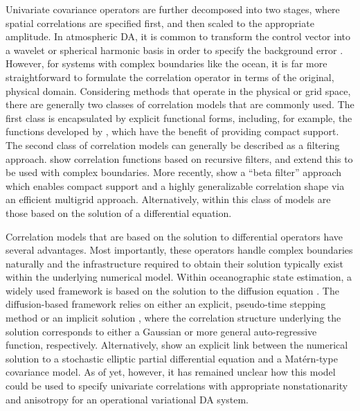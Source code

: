Univariate covariance operators are further decomposed into two stages, where spatial
correlations are specified first, and then scaled to the appropriate amplitude.
In atmospheric DA, it is common to transform the control vector
into a wavelet or spherical harmonic basis in order to specify the background
error \citep[e.g.,][]{bannister_review_2008-2}.
However, for systems with complex boundaries like the ocean, it is far more
straightforward to formulate the correlation operator in terms of the original,
physical domain.
Considering methods that operate in the physical or grid space, there are
generally two classes of correlation models that are commonly used.
The first class is encapsulated by explicit functional forms, including, for
example, the functions developed by
\citet{gaspari_construction_1999,gneiting_correlation_1999,gaspari_construction_2006},
which have the benefit of providing compact support.
The second class of correlation models can generally be described as a filtering
approach.
\citet{purser_numerical_2003-2,purser_numerical_2003-1}
show correlation functions based on recursive filters, and
\citet{dobricic_oceanographic_2008} extend this to be used with complex boundaries.
More recently, \citet{purser_multigrid_2022} show a ``beta
filter'' approach which enables compact support and a highly generalizable
correlation shape via an efficient multigrid approach.
Alternatively, within this class of models are those based on the solution of a
differential equation.

Correlation models that are based on the solution to differential operators have
several advantages.
Most importantly, these operators handle complex boundaries naturally and the
infrastructure required to obtain their solution typically exist within
the underlying numerical model.
Within oceanographic state estimation, a widely used framework is based on the
solution to the diffusion equation
\citep[e.g.,][]{nguyen_arctic_2021,forgetECCOv4,blockley_recent_2014,moore_regional_2011-1,daget_ensemble_2009,muccino_inverse_2008,di_lorenzo_weak_2007,weaver_three-_2003}.
The diffusion-based framework relies on either an explicit, pseudo-time stepping
method \citep{weaver_correlation_2001} or an implicit solution
\citep{mirouze_representation_2010,carrier_background-error_2010,weaver_diffusion_2013},
where the correlation structure underlying the solution corresponds to either a
Gaussian or more general auto-regressive function, respectively.
Alternatively, \citet{RSSB:RSSB777} show an explicit link between the numerical solution
to a stochastic elliptic partial differential equation and a Mat\'ern-type covariance
model.
As of yet, however, it has remained unclear how this model could be used to
specify univariate correlations with appropriate nonstationarity and anisotropy
for an operational variational DA system.

